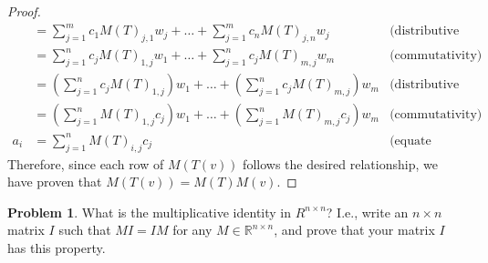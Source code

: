 \documentclass[12pt,reqno]{article}
\theoremstyle{definition}
\newtheorem{problem}{Problem}
\begin{document}
\begin{proof}
\begin{align*}
        &= \sum_{j=1}^{m}c_1M(T)_{j,1}w_j+\ldots+\sum_{j=1}^{m}c_nM(T)_{j,n}w_j & \text{(distributive property)}\\
        &= \sum_{j=1}^{n}c_jM(T)_{1,j}w_1+\ldots+\sum_{j=1}^{n}c_jM(T)_{m,j}w_m & \text{(commutativity)}\\
        &= (\sum_{j=1}^{n}c_jM(T)_{1,j})w_1+\ldots+(\sum_{j=1}^{n}c_jM(T)_{m,j})w_m & \text{(distributive property)}\\
        &= (\sum_{j=1}^{n}M(T)_{1,j}c_j)w_1+\ldots+(\sum_{j=1}^{n}M(T)_{m,j}c_j)w_m & \text{(commutativity)}\\
        a_i &= \sum_{j=1}^{n}M(T)_{i,j}c_j & \text{(equate coefficients)}
    \end{align*}
    Therefore, since each row of $M(T(v))$ follows the desired relationship, we have proven that $M(T(v)) = M(T)M(v)$.
\end{proof}
\newpage


\begin{problem}
    What is the multiplicative identity in $R^{n \times n}$? I.e., write an $n\times n $ matrix $I$ such that $MI=IM$ for any $M \in \mathbb{R}^{n\times n}$, and prove that your matrix $I$ has this property.
\end{problem}
\end{document}
